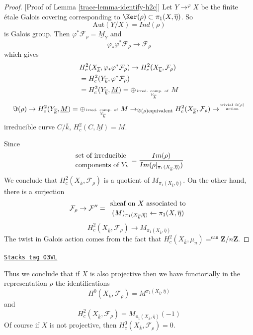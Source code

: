 \begin{proof}
[Proof of Lemma \ref{trace-lemma-identify-h2c}]
Let $Y\to^{\varphi}X$ be the finite \'etale Galois covering
corresponding to $\Ker(\rho) \subset \pi_1(X, \overline\eta)$. So
$$
\text{Aut}(Y/X)=Ind(\rho)
$$
is Galois group. Then $\varphi^*\mathcal{F}_\rho =\underline M_Y$ and
$$
\varphi_*\varphi^*\mathcal{F}_\rho\to \mathcal{F}_\rho
$$
which gives
\begin{align*}
& H_c^2(X_{\overline{k}}, \varphi_*\varphi^*\mathcal{F}_\rho) \to
H_c^2(X_{\overline{k}}, \mathcal{F}_\rho)\\
& =H_c^2(Y_{\overline{k}}, \varphi^*\mathcal{F}_\rho)\\
& =H_c^2(Y_{\overline{k}}, \underline M) = \oplus_{\text{irred.
comp. of } \atop Y_{\overline{k}}}M
\end{align*}
$$
\Im(\rho) \to H_c^2(Y_{\overline{k}}, \underline M) =
\oplus_{\text{irred. comp. of } \atop Y_{\overline{k}}}
M \to_{\Im(\rho) \text{equivalent}} H_c^2(X_{\overline{k}},
\mathcal{F}_{\rho}) \to^{\text{trivial }
\Im(\rho) \atop \text{action}}
$$
irreducible curve $C/\overline{k}$, $H_c^2(C, \underline M)=M$.

\medskip\noindent
Since
$$
{\text{set of irreducible } \atop \text{components of }Y_k} =
\frac{Im(\rho)}{Im(\rho|_{\pi_1(X_{\overline{k}}, \overline \eta)})}
$$
We conclude that $H_c^2(X_{\overline{k}}, \mathcal{F}_\rho)$ is a
quotient of $M_{\pi_1(X_{\overline{k}}, \overline \eta)}$. On the other hand,
there is a surjection
$$
\mathcal{F}_\rho\to \mathcal{F}'' = {\text{ sheaf on }
X\text{ associated to } \atop (M)_{\pi_1(X_{\overline{k}}, \overline
\eta)}\leftarrow\pi_1(X, \overline \eta)}
$$
$$
H_c^2(X_{\overline{k}}, \mathcal{F}_\rho)\to
M_{\pi_1(X_{\overline{k}}, \overline\eta)}
$$
The twist in Galois action comes from the fact that
$H_c^2(X_{\overline{k}}, \mu_n)=^{\text{can}} \mathbf{Z}/n\mathbf{Z}$.
\end{proof}

\begin{remark}[Projective]
\label{trace-remark-projective}
\href{https://stacks.math.columbia.edu/tag/03VL}{\texttt{Stacks tag 03VL}}

Thus we conclude that if $X$ is also projective then
we have functorially in the representation $\rho$
the identifications
$$
H^0(X_{\overline{k}}, \mathcal{F}_\rho) =
M^{\pi_1(X_{\overline{k}}, \overline\eta)}
$$
and
$$
H_c^2(X_{\overline{k}}, \mathcal{F}_\rho) =
M_{\pi_1(X_{\overline{k}}, \overline \eta)}(-1)
$$
Of course if $X$ is not projective, then
$H^0_c(X_{\overline{k}}, \mathcal{F}_\rho) = 0$.
\end{remark}


